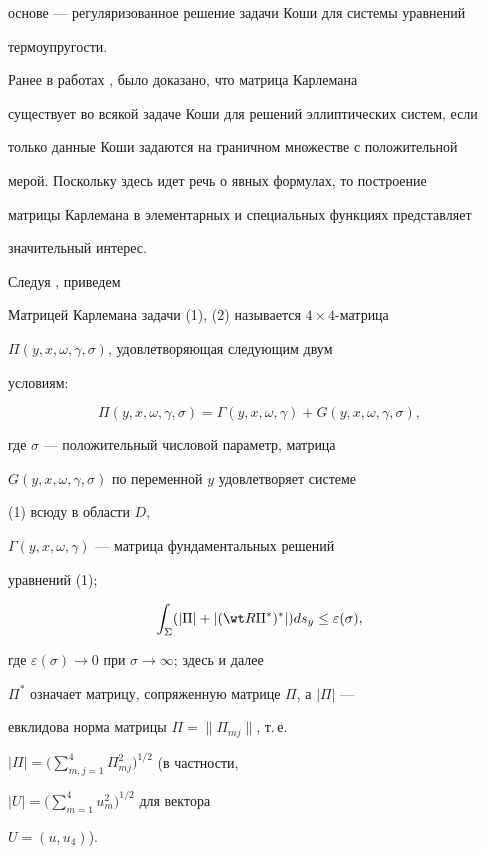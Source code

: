 основе --- регуляризованное решение задачи Коши для системы уравнений 


термоупругости. 


 


Ранее в работах \cite{5}, \cite{7} было доказано, что матрица Карлемана 


существует во всякой задаче Коши для решений эллиптических систем, если 


только данные Коши задаются на граничном множестве с положительной 


мерой. Поскольку здесь идет речь о явных формулах, то построение 


матрицы Карлемана в элементарных и специальных функциях представляет 


значительный интерес. 


 


Следуя \cite{9}, приведем 


 


\begin{defnnonum} 


Матрицей Карлемана задачи (1), (2) называется $4\times 4$-матрица 


$\Pi(y,x,\omega,\gamma,\sigma)$, удовлетворяющая следующим двум 


условиям: 


$$ 


\Pi(y,x,\omega,\gamma,\sigma)=\Gamma(y,x,\omega,\gamma)+ 


G(y,x,\omega,\gamma,\sigma), 


$$ 


где $\sigma$ --- положительный числовой параметр, матрица 


$G(y,x,\omega,\gamma,\sigma)$ по переменной $y$ удовлетворяет системе 


(1) всюду в области $D$, 


$\Gamma(y,x,\omega,\gamma)$ --- матрица фундаментальных решений 


уравнений (1); 


$$ 


\int_\Sigma(|\Pi|+|(\wt R\Pi^*)^*|)ds_y\le\varepsilon(\sigma), 


$$ 


где $\varepsilon(\sigma)\to 0$ при $\sigma\to\infty$; здесь и далее 


$\Pi^*$ означает матрицу, сопряженную матрице $\Pi$, а $|\Pi|$ --- 


евклидова норма матрицы $\Pi=\|\Pi_{mj}\|$, т.\,е. 


$|\Pi|=\Big(\sum\limits^4_{m,j=1}\Pi^2_{mj}\Big)^{1/2}$ (в частности, 


$|U|=\Big(\sum\limits^4_{m=1}u^2_m\Big)^{1/2}$ для вектора 


$U=(u,u_4)$). 


\end{defnnonum} 


